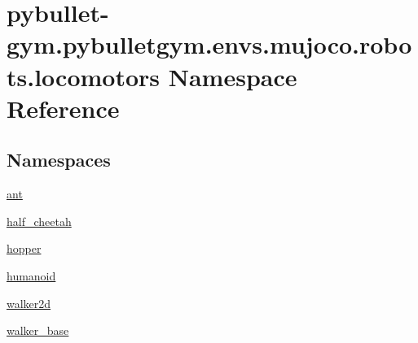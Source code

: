 \hypertarget{namespacepybullet-gym_1_1pybulletgym_1_1envs_1_1mujoco_1_1robots_1_1locomotors}{}\section{pybullet-\/gym.pybulletgym.\+envs.\+mujoco.\+robots.\+locomotors Namespace Reference}
\label{namespacepybullet-gym_1_1pybulletgym_1_1envs_1_1mujoco_1_1robots_1_1locomotors}
\subsection*{Namespaces}
\begin{DoxyCompactItemize}
\item 
 \hyperlink{namespacepybullet-gym_1_1pybulletgym_1_1envs_1_1mujoco_1_1robots_1_1locomotors_1_1ant}{ant}
\item 
 \hyperlink{namespacepybullet-gym_1_1pybulletgym_1_1envs_1_1mujoco_1_1robots_1_1locomotors_1_1half__cheetah}{half\+\_\+cheetah}
\item 
 \hyperlink{namespacepybullet-gym_1_1pybulletgym_1_1envs_1_1mujoco_1_1robots_1_1locomotors_1_1hopper}{hopper}
\item 
 \hyperlink{namespacepybullet-gym_1_1pybulletgym_1_1envs_1_1mujoco_1_1robots_1_1locomotors_1_1humanoid}{humanoid}
\item 
 \hyperlink{namespacepybullet-gym_1_1pybulletgym_1_1envs_1_1mujoco_1_1robots_1_1locomotors_1_1walker2d}{walker2d}
\item 
 \hyperlink{namespacepybullet-gym_1_1pybulletgym_1_1envs_1_1mujoco_1_1robots_1_1locomotors_1_1walker__base}{walker\+\_\+base}
\end{DoxyCompactItemize}
